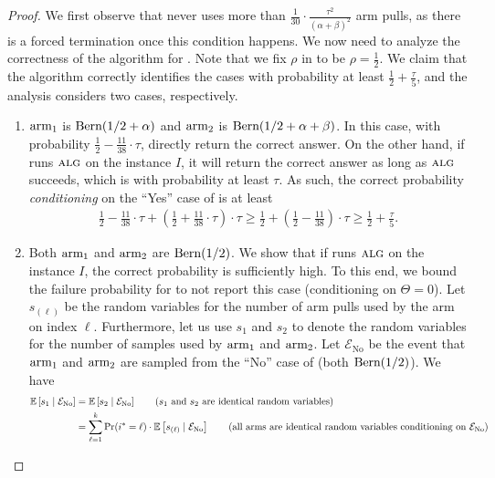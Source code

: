 \begin{proof}
	We first observe that  never uses more than $\frac{1}{30}\cdot \frac{\tau^2}{(\alpha+\beta)^2}$ arm pulls, as there is a forced termination once this condition happens. We now need to analyze the correctness of the algorithm for . Note that we fix $\rho$ in  to be $\rho=\frac{1}{2}$. We claim that the algorithm correctly identifies the cases with probability at least $\frac12+\frac{\tau}{5}$, and the analysis considers two cases, respectively.
	\begin{enumerate}[label=\roman*).]
		\item $\textnormal{arm}_1$ is $\textnormal{Bern}(1/2+\alpha)$ and $\textnormal{arm}_2$ is $\textnormal{Bern}(1/2+\alpha+\beta)$. In this case, with probability $\frac{1}{2}-\frac{11}{38}\cdot \tau$,  directly return the correct answer. On the other hand, if  runs $\mbox{\sc alg}$ on the instance $I$, it will return the correct answer as long as $\mbox{\sc alg}$ succeeds, which is with probability at least $\tau$. As such, the correct probability \emph{conditioning} on the ``Yes'' case of  is at least
		\begin{align*}
			\frac{1}{2}-\frac{11}{38}\cdot \tau + \left(\frac{1}{2}+\frac{11}{38}\cdot \tau\right)\cdot \tau \geq \frac{1}{2} +\left(\frac{1}{2}-\frac{11}{38}\right)\cdot \tau \geq \frac{1}{2}+ \frac{\tau}{5}.
		\end{align*}  
		\item Both $\textnormal{arm}_1$ and $\textnormal{arm}_2$ are $\textnormal{Bern}(1/2)$. We show that if  runs $\mbox{\sc alg}$ on the instance $I$, the correct probability is sufficiently high. To this end, we bound the failure probability for  to not report this case (conditioning on $\Theta=0$). Let $s_{(\ell)}$ be the random variables for the number of arm pulls used by the arm on index $\ell$. Furthermore, let us use $s_1$ and $s_2$ to denote the random variables for the number of samples used by $\textnormal{arm}_1$ and $\textnormal{arm}_2$. Let $\mathcal{E}_{\text{No}}$ be the event that $\textnormal{arm}_1$ and $\textnormal{arm}_2$ are sampled from the ``No'' case of  (both $\textnormal{Bern}(1/2)$). We have
		\begin{align*}
			\expect{s_1\mid \mathcal{E}_{\text{No}}} &= \expect{s_2\mid \mathcal{E}_{\text{No}}} \tag{$s_1$ and $s_2$ are identical random variables}\\
			&= \sum_{\ell=1}^{k} \Pr(i^* = \ell)\cdot \expect{s_{(\ell)}\mid \mathcal{E}_{\text{No}}} \tag{all arms are identical random variables conditioning on $\mathcal{E}_{\text{No}}$}\\

\end{align*}
\end{enumerate}
\end{proof}
